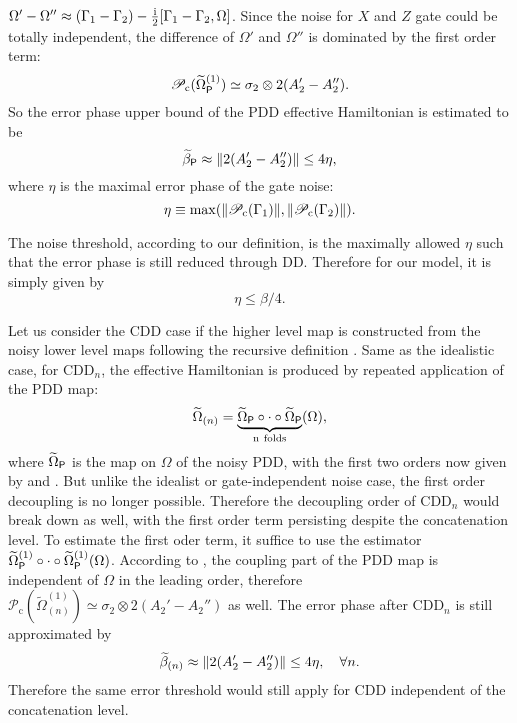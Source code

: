 \documentclass[aps,pra,reprint,superscriptaddress]{revtex4-2}
\newcommand{\betat}{\widetilde{\beta}}
\newcommand{\Pcp}{\mathscr{P}_{\mathrm{c}}}
\begin{document}
$\Omega'-\Omega'' \approx (\Gamma_1-\Gamma_2) -\frac{\mathrm{i}}{2} [\Gamma_1-\Gamma_2,\Omega]$.
Since the noise for $X$ and $Z$ gate could be totally independent, the difference of  $\Omega'$ and $\Omega''$ is dominated by the first order term:
\begin{equation}\label{eq:PDDmap-gatedep-lo}
\Pcp(\widetilde{\Omega}_\sP^{(1)})
    \simeq  \sigma_2 \otimes 2(A_2'-A_2'').
\end{equation}
So the error phase upper bound of the PDD effective Hamiltonian is estimated to be 
\begin{equation}
    \betat_{\sP} \approx \norm{2(A_2'-A_2'') } \le 4 \eta,
\end{equation} 
where $\eta$ is the maximal error phase of the gate noise:
\begin{equation}
    \eta \equiv \max( \norm{\Pcp(\Gamma_1)},\norm{\Pcp(\Gamma_2)} ).
\end{equation}

The noise threshold, according to our definition, is the maximally allowed $\eta$ such that the error phase is still reduced through DD. Therefore for our model, it is simply given by 
\begin{equation}\label{eq:gatedep-threshold}
    \eta\le \beta/4.
\end{equation}

Let us consider the CDD case if the higher level map is constructed from the noisy lower level maps following the recursive definition . Same as the idealistic case, for $\mathrm{CDD}_n$, the effective Hamiltonian is 
produced by repeated application of the PDD map:
\begin{equation}
\widetilde{\Omega}_{(n)} = \underbrace{\widetilde{\Omega}_{\mathsf{P}}\circ \cdot \circ\widetilde{\Omega}_{\mathsf{P}}}_{\mathrm{n\ folds}}( \Omega ),
\end{equation}
where $\widetilde{\Omega}_{\mathsf{P}}$ is the map on $\Omega$ of the noisy PDD, with the first two orders now given by  and . But unlike the idealist or gate-independent noise case, the first order decoupling is no longer possible. Therefore the decoupling order of  $\mathrm{CDD}_n$ would break down as well, with the first order term persisting despite the concatenation level. To estimate the first oder term, 
it suffice to use the estimator $\widetilde{\Omega}_{\mathsf{P}}^{(1)}\circ \cdot \circ\widetilde{\Omega}_{\mathsf{P}}^{(1)}( \Omega )$. According to , the coupling part of the PDD map is independent of $\Omega$ in the leading order, therefore $\Pcp(\widetilde{\Omega}_{(n)}^{(1)})
\simeq  \sigma_2 \otimes 2(A_2'-A_2'')$
as well. The error phase after $\mathrm{CDD}_n$ is still approximated by 
\begin{equation}
    \betat_{(n)} \approx \norm{2(A_2'-A_2'') } \le 4 \eta,\quad \forall n.
\end{equation} 
 Therefore the same error threshold  would still apply for CDD independent of the concatenation level. 
\end{document}
